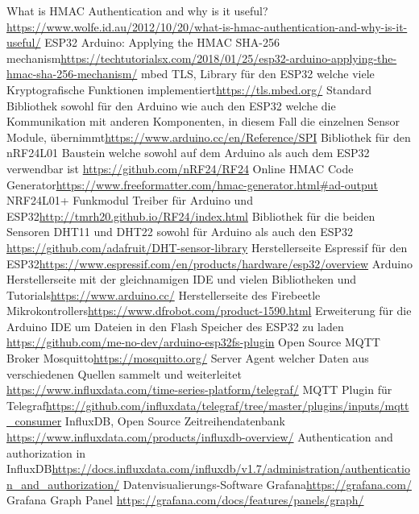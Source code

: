 \documentclass[
  12pt, %
  a4paper, %
  twoside, %
  openany, %
  numbers=noenddot, %
  BCOR=5mm, %
  parskip=half*, %
  thesis, %
]{bfhbook}
\begin{document}
\renewcommand\bibname{Linkverzeichnis}
\begin{thebibliography}{99}
   What is HMAC Authentication and why is it useful?\break \url{https://www.wolfe.id.au/2012/10/20/what-is-hmac-authentication-and-why-is-it-useful/}
    ESP32 Arduino: Applying the HMAC SHA-256 mechanism\break \url{https://techtutorialsx.com/2018/01/25/esp32-arduino-applying-the-hmac-sha-256-mechanism/}
     mbed TLS, Library für den ESP32 welche viele Kryptografische Funktionen implementiert\break \url{https://tls.mbed.org/}
     Standard Bibliothek sowohl für den Arduino wie auch den ESP32 welche die Kommunikation mit anderen Komponenten, in diesem Fall die einzelnen Sensor Module, übernimmt\break \url{https://www.arduino.cc/en/Reference/SPI}
     Bibliothek für den nRF24L01 Baustein welche sowohl auf dem Arduino als auch dem ESP32 verwendbar ist \break \url{https://github.com/nRF24/RF24}
    Online HMAC Code Generator\break \url{https://www.freeformatter.com/hmac-generator.html#ad-output}
    NRF24L01+ Funkmodul Treiber für Arduino und ESP32\break \url{http://tmrh20.github.io/RF24/index.html}
     Bibliothek für die beiden Sensoren DHT11 und DHT22 sowohl für Arduino als auch den ESP32 \break \url{https://github.com/adafruit/DHT-sensor-library}
    Herstellerseite Espressif für den ESP32\break \url{https://www.espressif.com/en/products/hardware/esp32/overview}
    Arduino Herstellerseite mit der gleichnamigen IDE und vielen Bibliotheken und Tutorials\break \url{https://www.arduino.cc/}
    Herstellerseite des Firebeetle Mikrokontrollers\break \url{https://www.dfrobot.com/product-1590.html}
    Erweiterung für die Arduino IDE um Dateien in den Flash Speicher des ESP32 zu laden \break \url{https://github.com/me-no-dev/arduino-esp32fs-plugin}
    Open Source MQTT Broker Mosquitto\break \url{https://mosquitto.org/}
     Server Agent welcher Daten aus verschiedenen Quellen sammelt und weiterleitet \break \url{https://www.influxdata.com/time-series-platform/telegraf/}
    MQTT Plugin für Telegraf\break \url{https://github.com/influxdata/telegraf/tree/master/plugins/inputs/mqtt_consumer}
     InfluxDB, Open Source Zeitreihendatenbank \break \url{https://www.influxdata.com/products/influxdb-overview/}
    Authentication and authorization in InfluxDB\break \url{https://docs.influxdata.com/influxdb/v1.7/administration/authentication_and_authorization/}
     Datenvisualierungs-Software Grafana\break \url{https://grafana.com/}
    Grafana Graph Panel \break \url{https://grafana.com/docs/features/panels/graph/}
  \end{thebibliography}
\end{document}
